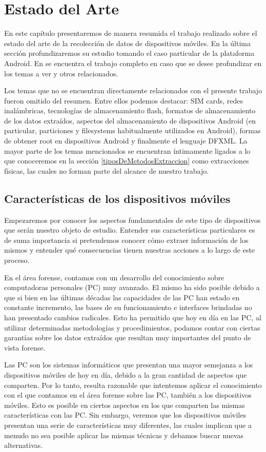 \chapter{Estado del Arte} \label{chap:EstadoDelArte}
En este capítulo presentaremos de manera resumida el trabajo realizado sobre el estado del arte de la recolección de datos de dispositivos móviles. En la última sección profundizaremos su estudio tomando el caso particular de la plataforma Android. En \cite{estadoDelArte} se encuentra el trabajo completo en caso que se desee profundizar en los temas a ver y otros relacionados.

Los temas que no se encuentran directamente relacionados con el presente trabajo fueron omitido del resumen. Entre ellos podemos destacar: SIM cards, redes inalámbricas, tecnologías de almacenamiento flash, formatos de almacenamiento de los datos extraídos, aspectos del almacenamiento de dispositivos Android (en particular, particiones y filesystems habitualmente utilizados en Android), formas de obtener root en dispositivos Android y finalmente el lenguaje DFXML. La mayor parte de los temas mencionados se encuentran íntimamente ligados a lo que conoceremos en la sección \ref{tiposDeMetodosExtraccion} como extracciones físicas, las cuales no forman parte del alcance de nuestro trabajo.

\section{Características de los dispositivos móviles}
Empezaremos por conocer los aspectos fundamentales de este tipo de dispositivos que serán nuestro objeto de estudio. Entender sus características particulares es de suma importancia si pretendemos conocer cómo extraer información de los mismos y entender qué consecuencias tienen nuestras acciones a lo largo de este proceso.

En el área forense, contamos con un desarrollo del conocimiento sobre computadoras personales (PC) muy avanzado. El mismo ha sido posible debido a que si bien en las últimas décadas las capacidades de las PC han estado en constante incremento, las bases de su funcionamiento e interfaces brindadas no han presentado cambios radicales. Esto ha permitido que hoy en día en las PC, al utilizar determinadas metodologías y procedimientos, podamos contar con ciertas garantías sobre los datos extraídos que resultan muy importantes del punto de vista forense.

Las PC son los sistemas informáticos que presentan una mayor semejanza a los dispositivos móviles de hoy en día, debido a la gran cantidad de aspectos que comparten. Por lo tanto, resulta razonable que intentemos aplicar el conocimiento con el que contamos en el área forense sobre las PC, también a los dispositivos móviles. Esto es posible en ciertos aspectos en los que comparten las mismas características con las PC. Sin embargo, veremos que los dispositivos móviles presentan una serie de características muy diferentes, las cuales implican que a menudo no sea posible aplicar las mismas técnicas y debamos buscar nuevas alternativas.

